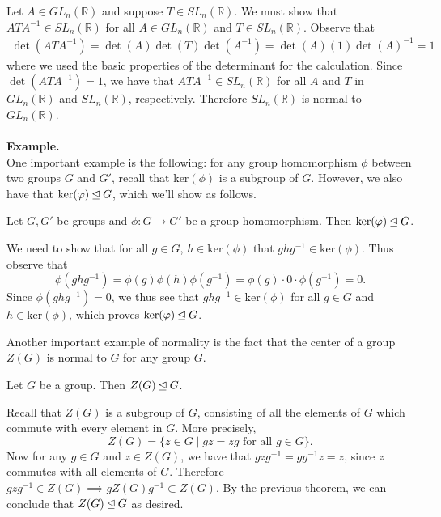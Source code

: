     Let $A \in GL_n(\mathbb{R})$ and suppose $T
    \in SL_n(\mathbb{R})$. We must show that $ATA^{-1} \in
    SL_n(\mathbb{R})$ for all $A \in GL_n(\mathbb{R})$ and $T \in
    SL_n(\mathbb{R})$. Observe that 
    \begin{align*}
        \det(ATA^{-1}) = \det(A)\det(T)\det(A^{-1})
        = \det(A)(1)\det(A)^{-1} = 1
    \end{align*}
    where we used the basic properties of the determinant for the
    calculation. Since $\det(ATA^{-1}) = 1$, we have that $ATA^{-1}
    \in SL_n(\mathbb{R})$ for all $A$ and $T$ in $GL_n(\mathbb{R})$
    and $SL_n(\mathbb{R})$, respectively. Therefore $SL_n(\mathbb{R})$
    is normal to $GL_n(\mathbb{R})$.   
    \\
    \\
    \textbf{Example.}
    \\
    One important example is the following: for any group homomorphism
    $\phi$ between two groups $G$ and $G'$, recall that
    $\mbox{ker}(\phi)$ is a subgroup of $G$. However, we also have
    that $\mbox{ker}(\varphi) \unlhd G$, which we'll show as follows.

    \begin{proposition}
        Let $G, G'$ be groups and $\phi: G \to G'$ be a group
        homomorphism. Then $\ker(\varphi) \unlhd G$.
    \end{proposition}

    \begin{prf}
        We need to show that for all $g \in G$, $h \in \mbox{ker}(\phi)$
        that $ghg^{-1} \in \mbox{ker}(\phi)$. Thus observe that 
        \[
            \phi(ghg^{-1}) = \phi(g)\phi(h)\phi(g^{-1})
            = \phi(g)\cdot 0 \cdot \phi(g^{-1}) = 0.
        \]
        Since $\phi(ghg^{-1}) = 0$, we thus see that $ghg^{-1} \in
        \mbox{ker}(\phi)$ for all $g \in G$ and $h \in \mbox{ker}(\phi)$,
        which proves $\mbox{ker}(\varphi) \unlhd G$.    
    \end{prf}

    Another important example of normality is the fact that the
    center of a group $Z(G)$ is normal to $G$ for any group $G$.

    \begin{proposition}\label{normal_center}
        Let $G$ be a group. Then $Z(G) \unlhd G$.
    \end{proposition}

    \begin{prf}
        Recall that $Z(G)$ is a subgroup of $G$, consisting of all the
        elements of $G$ which commute with every element in $G$. More
        precisely, 
        \[
            Z(G) = \{z \in G \mid gz = zg \text{ for all } g \in G\}.
        \]
        Now for any $g \in G$ and $z \in Z(G)$, we have that $gzg^{-1}
        = gg^{-1}z = z$, since $z$ commutes with all elements of $G$.
        Therefore $gzg^{-1} \in Z(G) \implies gZ(G)g^{-1} \subset
        Z(G)$. By the previous theorem, we can conclude that $Z(G)
        \unlhd G$ as desired.
    \end{prf}


